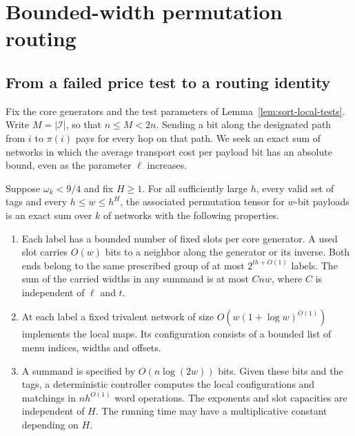 \section{Bounded-width permutation routing}\label{sec:sort-route}
\subsection{From a failed price test to a routing identity}

Fix the core generators and the test parameters of
Lemma~\ref{lem:sort-local-tests}. Write $M=|\mathcal I|$, so that
$n\le M<2n$. Sending a bit along the designated path from $i$ to
$\pi(i)$ pays for every hop on that path. We seek an exact sum of
networks in which the average transport cost per payload bit has an
absolute bound, even as the parameter $\ell$ increases.

\begin{proposition}\label{prop:sort-protocol}
Suppose $\omega_k<9/4$ and fix $H\ge1$. For all sufficiently large
$h$, every valid set of tags and every $h\le w\le h^H$, the associated
permutation tensor for $w$-bit payloads is an exact sum over $k$ of
networks with the following properties.
\begin{enumerate}
\item Each label has a bounded number of fixed slots per core generator.
A used slot carries $O(w)$ bits to a neighbor along the generator or its
inverse. Both ends belong to the same prescribed group of at most
$2^{th+O(1)}$ labels. The sum of the carried widths in any summand is
at most $Cnw$, where $C$ is independent of $\ell$ and $t$.
\item At each label a fixed trivalent network of size
$O(w(1+\log w)^{O(1)})$ implements the local maps. Its configuration
consists of a bounded list of menu indices, widths and offsets.
\item A summand is specified by $O(n\log(2w))$ bits. Given these bits
and the tags, a deterministic controller computes the local
configurations and matchings in $nh^{O(1)}$ word operations.
The exponents and slot capacities are independent of $H$. The running
time may have a multiplicative constant depending on $H$.
\end{enumerate}
\end{proposition}

